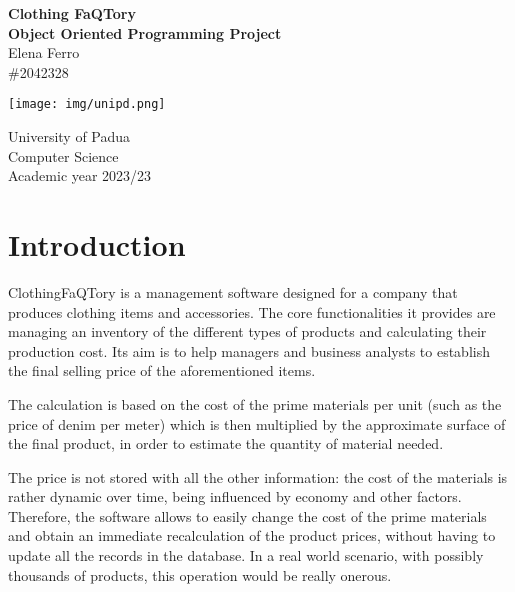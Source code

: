 \documentclass[10pt]{article}
\begin{document}
\begin{titlepage}

    \begin{center}
        \vspace*{1cm}
        \Huge
        \textbf{Clothing FaQTory}\\
        \LARGE
        \textbf{Object Oriented Programming Project}\\
        \vspace{1cm}
        \Large
        Elena Ferro\\
        \large
        \#2042328

        \vspace{10cm}

        \texttt{[image: img/unipd.png]}

        \Large
        \vspace{1cm}
        University of Padua\\
        \vspace{0.3cm}
        {\large Computer Science\\}
        \vspace{0.3cm}
        Academic year 2023/23

    \end{center}
\end{titlepage}
\pagestyle{fancy}
\section{Introduction}
ClothingFaQTory is a management software designed for a company that produces
clothing items and accessories. The core functionalities it provides are
managing an inventory of the different types of products and calculating their
production cost. Its aim is to help managers and business analysts to establish
the final selling price of the aforementioned items.

The calculation is based on the cost of the prime materials per unit (such as
the price of denim per meter) which is then multiplied by the approximate
surface of the final product, in order to estimate the quantity of material
needed.

The price is not stored with all the other information: the cost of the
materials is rather dynamic over time, being influenced by economy and other
factors. Therefore, the software allows to easily change the cost of the prime
materials and obtain an immediate recalculation of the product prices, without
having to update all the records in the database. In a real world scenario,
with possibly thousands of products, this operation would be really onerous.
\end{document}
